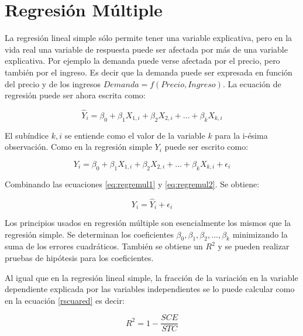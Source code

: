 \documentclass[]{book}
\begin{document}
\hypertarget{regresion-multiple}{%
\section{Regresión Múltiple}\label{regresion-multiple}}

La regresión lineal simple sólo permite tener una variable explicativa, pero en la vida real una variable de respuesta puede ser afectada por más de una variable explicativa. Por ejemplo la demanda puede verse afectada por el precio, pero también por el ingreso. Es decir que la demanda puede ser expresada en función del precio y de los ingresos \(Demanda=f\left(Precio,Ingreso\right)\). La ecuación de regresión puede ser ahora escrita como:

\begin{equation}
\hat{Y}_i = \beta_0 + \beta_1 X_{1,i} + \beta_2 X_{2,i}  + \ldots + \beta_k X_{k,i}
    \label{eq:regremul1}
\end{equation}

El subíndice \(k,i\) se entiende como el valor de la variable \(k\) para la i-ésima observación. Como en la regresión simple \(Y_i\) puede ser escrito como:

\begin{equation}
Y_i = \beta_0 + \beta_1 X_{1,i} + \beta_2 X_{2,i}  + \ldots + \beta_k X_{k,i} + \epsilon_i
    \label{eq:regremul2}
\end{equation}

Combinando las ecuaciones \eqref{eq:regremul1} y \eqref{eq:regremul2}. Se obtiene:

\begin{equation}
Y_i = \hat{Y}_i + \epsilon_i
    \label{eq:regremul3}
\end{equation}

Los principios usados en regresión múltiple son esencialmente los mismos que la regresión simple. Se determinan los coeficientes \(\beta_0,\beta_1,\beta_2,\ldots,\beta_k\) minimizando la suma de los errores cuadráticos. También se obtiene un \(R^2\) y se pueden realizar pruebas de hipótesis para los coeficientes.

Al igual que en la regresión lineal simple, la fracción de la variación en la variable dependiente explicada por las variables independientes se lo puede calcular como en la ecuación \ref{rscuared} es decir:

\begin{equation}
R^2 = 1 - \dfrac{SCE}{STC}
    \label{eq:rscuared2}
\end{equation}
\end{document}
